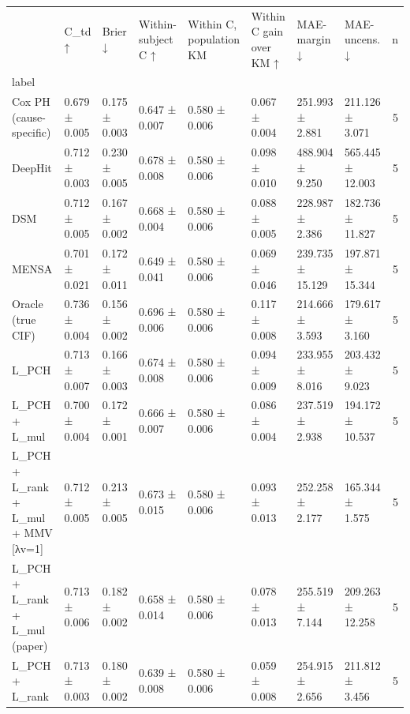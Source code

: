 \begin{tabular}{llllllllr}
\toprule
 & C\_td ↑ & Brier ↓ & Within-subject C ↑ & Within C, population KM & Within C gain over KM ↑ & MAE-margin ↓ & MAE-uncens. ↓ & n \\
label &  &  &  &  &  &  &  &  \\
\midrule
Cox PH (cause-specific) & 0.679 ± 0.005 & 0.175 ± 0.003 & 0.647 ± 0.007 & 0.580 ± 0.006 & 0.067 ± 0.004 & 251.993 ± 2.881 & 211.126 ± 3.071 & 5 \\
DeepHit & 0.712 ± 0.003 & 0.230 ± 0.005 & 0.678 ± 0.008 & 0.580 ± 0.006 & 0.098 ± 0.010 & 488.904 ± 9.250 & 565.445 ± 12.003 & 5 \\
DSM & 0.712 ± 0.005 & 0.167 ± 0.002 & 0.668 ± 0.004 & 0.580 ± 0.006 & 0.088 ± 0.005 & 228.987 ± 2.386 & 182.736 ± 11.827 & 5 \\
MENSA & 0.701 ± 0.021 & 0.172 ± 0.011 & 0.649 ± 0.041 & 0.580 ± 0.006 & 0.069 ± 0.046 & 239.735 ± 15.129 & 197.871 ± 15.344 & 5 \\
Oracle (true CIF) & 0.736 ± 0.004 & 0.156 ± 0.002 & 0.696 ± 0.006 & 0.580 ± 0.006 & 0.117 ± 0.008 & 214.666 ± 3.593 & 179.617 ± 3.160 & 5 \\
L\_PCH & 0.713 ± 0.007 & 0.166 ± 0.003 & 0.674 ± 0.008 & 0.580 ± 0.006 & 0.094 ± 0.009 & 233.955 ± 8.016 & 203.432 ± 9.023 & 5 \\
L\_PCH + L\_mul & 0.700 ± 0.004 & 0.172 ± 0.001 & 0.666 ± 0.007 & 0.580 ± 0.006 & 0.086 ± 0.004 & 237.519 ± 2.938 & 194.172 ± 10.537 & 5 \\
L\_PCH + L\_rank + L\_mul + MMV [λv=1] & 0.712 ± 0.005 & 0.213 ± 0.005 & 0.673 ± 0.015 & 0.580 ± 0.006 & 0.093 ± 0.013 & 252.258 ± 2.177 & 165.344 ± 1.575 & 5 \\
L\_PCH + L\_rank + L\_mul (paper) & 0.713 ± 0.006 & 0.182 ± 0.002 & 0.658 ± 0.014 & 0.580 ± 0.006 & 0.078 ± 0.013 & 255.519 ± 7.144 & 209.263 ± 12.258 & 5 \\
L\_PCH + L\_rank & 0.713 ± 0.003 & 0.180 ± 0.002 & 0.639 ± 0.008 & 0.580 ± 0.006 & 0.059 ± 0.008 & 254.915 ± 2.656 & 211.812 ± 3.456 & 5 \\
\bottomrule
\end{tabular}
